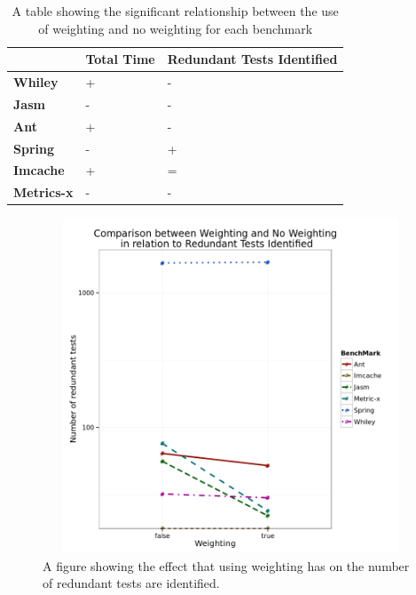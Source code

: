 \begin{table}[h]
\centering


\begin{tabular}{|l|l|l|}
\hline
{\bf }          & {\bf Total Time} & {\bf Redundant Tests Identified} \\ \hline
{\bf Whiley}    & +                & -                           \\ \hline
{\bf Jasm}      & -                & -                           \\ \hline
{\bf Ant}       & +                & -                           \\ \hline
{\bf Spring}    & -                & +                           \\ \hline
{\bf Imcache}   & +                & =                           \\ \hline
{\bf Metrics-x} & -                & -                           \\ \hline
\end{tabular}
\caption{A table showing the significant relationship between the use of weighting and no weighting for each benchmark}
\label{weightingsig}
\end{table}


\begin{figure}[h]
\begin{center}
\includegraphics[height=10cm, width = 14.5cm]{Weighting.png}
\end{center}
\caption{A figure showing the effect that using weighting has on the number of redundant tests are identified.}
\label{fig:weightgraph}
\end{figure}

